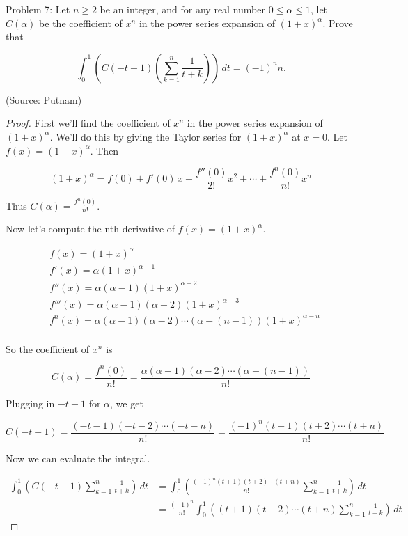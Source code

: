 \usepackage{amsthm}

Problem 7: Let $n \ge 2$ be an integer, and for any real number $0 \le \alpha \le 1$, let $C(\alpha)$ be the coefficient of $x^n$ in the power series expansion of $(1+x)^\alpha$. Prove that

\[\int_0^1 \left(C(-t-1)\left(\sum_{k=1}^n \frac{1}{t+k}\right)\right)\,dt = (-1)^n n. \]

(Source: Putnam)

\begin{proof}
First we'll find the coefficient of $x^n$ in the power series expansion of $(1 + x)^\alpha$. We'll do this by giving the Taylor series for $(1 + x)^\alpha$ at $x = 0$. Let $f(x) = (1 + x)^\alpha$. Then

\[ 
(1 + x)^\alpha = f(0) + f'(0) \, x + \frac{f''(0)}{2!}x^2 + \cdots + \frac{f^n(0)}{n!}x^n 
\]

Thus $\displaystyle C(\alpha) = \frac{f^n(0)}{n!}$.

Now let's compute the nth derivative of $f(x) = (1 + x)^\alpha$.

\begin{align*}
& f(x) = (1 + x)^\alpha \\
& f'(x) = \alpha(1 + x)^{\alpha - 1} \\
& f''(x) = \alpha(\alpha - 1)(1 + x)^{\alpha - 2} \\
& f'''(x) = \alpha(\alpha - 1)(\alpha - 2)(1 + x)^{\alpha - 3} \\
& f^n(x) = \alpha(\alpha - 1)(\alpha - 2)\cdots(\alpha - (n-1))(1 + x)^{\alpha - n} \\
\end{align*}

So the coefficient of $x^n$ is

\[ C(\alpha) = \frac{f^n(0)}{n!} = \frac{\alpha(\alpha - 1)(\alpha - 2)\cdots(\alpha - (n-1))}{n!} \]

Plugging in $-t - 1$ for $\alpha$, we get

\[ C(-t - 1) = \frac{(-t - 1)(-t - 2)\cdots(-t - n)}{n!} = \frac{(-1)^n (t + 1)(t + 2)\cdots(t + n)}{n!} \]

Now we can evaluate the integral.

\begin{align*}
\int_0^1 \left(C(-t - 1) \sum_{k=1}^{n} \frac{1}{t + k} \right) \, dt 
&= \int_0^1 \left( \frac{(-1)^n (t + 1)(t + 2)\cdots(t + n)}{n!} \sum_{k=1}^{n} \frac{1}{t + k} \right) \, dt \\
&= \frac{(-1)^n}{n!} \int_0^1 \left( (t + 1)(t + 2)\cdots(t + n) \sum_{k=1}^{n} \frac{1}{t + k} \right) \, dt
\end{align*}


\end{proof}

